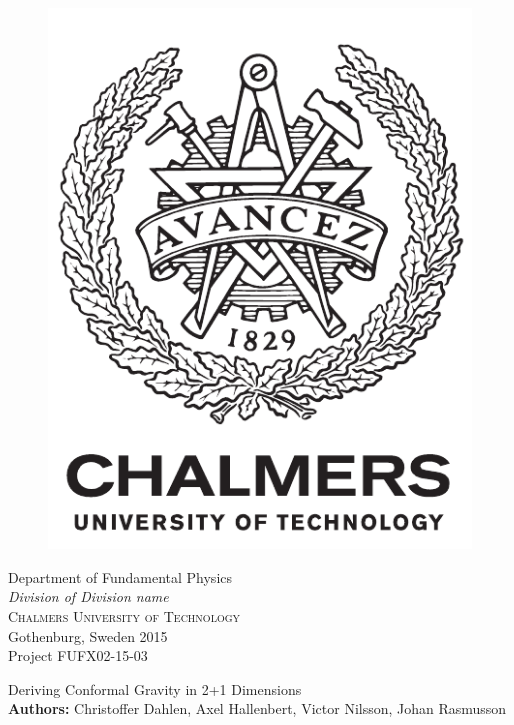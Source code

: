 	\vfill	
	       \begin{center}
	\begin{figure}[h!]
	\centering
	\includegraphics[width=0.2\pdfpagewidth]{code/frontpage/logo_eng.pdf} \\	
	\end{figure}	\vspace{5mm}	
	
	Department of Fundamental Physics \\
	\emph{Division of Division name}\\
	\textsc{Chalmers University of Technology} \\
	Gothenburg, Sweden 2015 \\
	Project FUFX02-15-03
\end{center}


\newpage
\thispagestyle{plain}
\vspace*{4.5cm}
Deriving Conformal Gravity in 2+1 Dimensions\\

\textbf{Authors:} Christoffer Dahlen, Axel Hallenbert, Victor Nilsson, Johan Rasmusson\\


